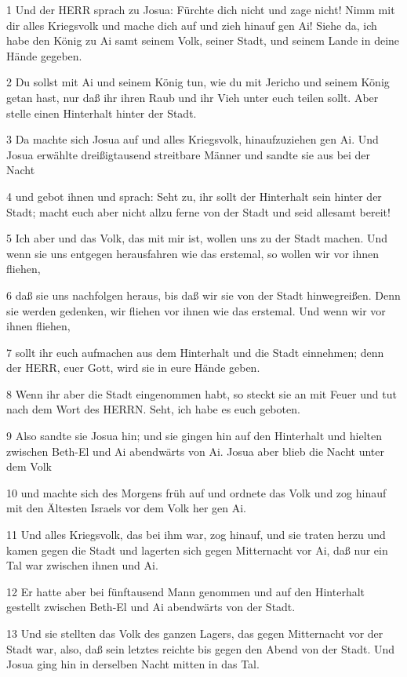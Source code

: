\par 1 Und der HERR sprach zu Josua: Fürchte dich nicht und zage nicht! Nimm mit dir alles Kriegsvolk und mache dich auf und zieh hinauf gen Ai! Siehe da, ich habe den König zu Ai samt seinem Volk, seiner Stadt, und seinem Lande in deine Hände gegeben.
\par 2 Du sollst mit Ai und seinem König tun, wie du mit Jericho und seinem König getan hast, nur daß ihr ihren Raub und ihr Vieh unter euch teilen sollt. Aber stelle einen Hinterhalt hinter der Stadt.
\par 3 Da machte sich Josua auf und alles Kriegsvolk, hinaufzuziehen gen Ai. Und Josua erwählte dreißigtausend streitbare Männer und sandte sie aus bei der Nacht
\par 4 und gebot ihnen und sprach: Seht zu, ihr sollt der Hinterhalt sein hinter der Stadt; macht euch aber nicht allzu ferne von der Stadt und seid allesamt bereit!
\par 5 Ich aber und das Volk, das mit mir ist, wollen uns zu der Stadt machen. Und wenn sie uns entgegen herausfahren wie das erstemal, so wollen wir vor ihnen fliehen,
\par 6 daß sie uns nachfolgen heraus, bis daß wir sie von der Stadt hinwegreißen. Denn sie werden gedenken, wir fliehen vor ihnen wie das erstemal. Und wenn wir vor ihnen fliehen,
\par 7 sollt ihr euch aufmachen aus dem Hinterhalt und die Stadt einnehmen; denn der HERR, euer Gott, wird sie in eure Hände geben.
\par 8 Wenn ihr aber die Stadt eingenommen habt, so steckt sie an mit Feuer und tut nach dem Wort des HERRN. Seht, ich habe es euch geboten.
\par 9 Also sandte sie Josua hin; und sie gingen hin auf den Hinterhalt und hielten zwischen Beth-El und Ai abendwärts von Ai. Josua aber blieb die Nacht unter dem Volk
\par 10 und machte sich des Morgens früh auf und ordnete das Volk und zog hinauf mit den Ältesten Israels vor dem Volk her gen Ai.
\par 11 Und alles Kriegsvolk, das bei ihm war, zog hinauf, und sie traten herzu und kamen gegen die Stadt und lagerten sich gegen Mitternacht vor Ai, daß nur ein Tal war zwischen ihnen und Ai.
\par 12 Er hatte aber bei fünftausend Mann genommen und auf den Hinterhalt gestellt zwischen Beth-El und Ai abendwärts von der Stadt.
\par 13 Und sie stellten das Volk des ganzen Lagers, das gegen Mitternacht vor der Stadt war, also, daß sein letztes reichte bis gegen den Abend von der Stadt. Und Josua ging hin in derselben Nacht mitten in das Tal.
